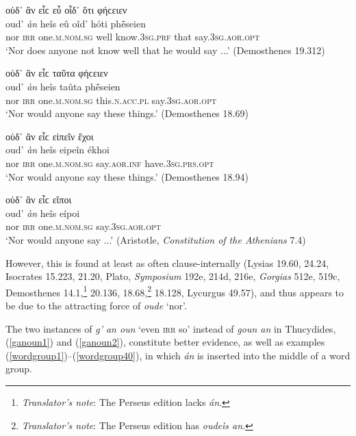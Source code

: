 \begin{exe}
\ex οὐδ᾽ ἂν εἷϲ εὖ οἶδ᾽ ὅτι φήϲειεν\\
\gll oud' \emph{àn} heîs eû oîd' hóti phḗseien\\
nor \textsc{irr} one.\textsc{m.nom.sg} well know.\textsc{3sg.prf} that say.\textsc{3sg.aor.opt}\\
\trans `Nor does anyone not know well that he would say ...' (Demosthenes 19.312)
\label{ansplit4}
\end{exe}

\begin{exe}
\ex οὐδ᾽ ἂν εἷϲ ταῦτα φήϲειεν\\
\gll oud' \emph{àn} heîs taûta phḗseien\\
nor \textsc{irr} one.\textsc{m.nom.sg} this.\textsc{n.acc.pl} say.\textsc{3sg.aor.opt}\\
\trans `Nor would anyone say these things.' (Demosthenes 18.69)
\label{ansplit5}
\end{exe}

\begin{exe}
\ex οὐδ᾽ ἂν εἷϲ εἰπεῖν ἔχοι\\
\gll oud' \emph{àn} heîs eipeîn ékhoi\\
nor \textsc{irr} one.\textsc{m.nom.sg} say.\textsc{aor.inf} have.\textsc{3sg.prs.opt}\\
\trans `Nor would anyone say these things.' (Demosthenes 18.94)
\label{ansplit6}
\end{exe}

\begin{exe}
\ex οὐδ᾽ ἂν εἷϲ εἴποι\\
\gll oud' \emph{àn} heîs eípoi\\
nor \textsc{irr} one.\textsc{m.nom.sg} say.\textsc{3sg.aor.opt}\\
\trans `Nor would anyone say ...' (Aristotle, \textit{Constitution of the Athenians} 7.4)
\label{ansplit7}
\end{exe}

However, this  is found at least as often clause-internally (Lysias 19.60, 24.24, Isocrates 15.223, 21.20, Plato, \textit{Symposium} 192e, 214d, 216e, \textit{Gorgias} 512e, 519c, Demosthenes 14.1,\footnote{\emph{Translator's note}: The Perseus edition lacks \textit{án}.} 20.136, 18.68,\footnote{\emph{Translator's note}: The Perseus edition has \textit{oudeìs an}.} 18.128, Lycurgus 49.57), and thus appears to be due to the attracting force of \emph{oude} `nor'.

The two instances of \emph{g' an oun} `even \textsc{irr} so' instead of \emph{goun an} in Thucydides, (\ref{ganoun1}) and (\ref{ganoun2}), constitute better evidence, as well as examples (\ref{wordgroup1})--(\ref{wordgroup40}), in which \emph{án} is inserted into the middle of a word group.

